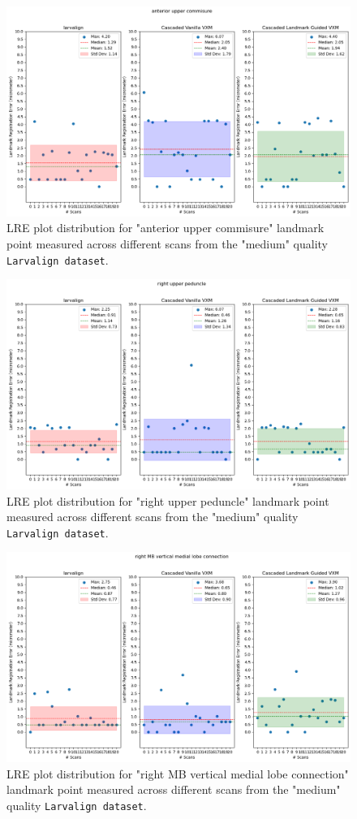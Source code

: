 	\begin{figure}[h!]
		\centering
		\includegraphics[width=0.75\columnwidth]{resources/chapter5_fresh/output/anterior upper commisure.png}
		\caption{LRE plot distribution for "anterior upper commisure" landmark point measured across different scans from the "medium" quality \texttt{Larvalign dataset}.}
		\label{fig:landmark18}
	\end{figure}

	\begin{figure}[h!]
		\centering
		\includegraphics[width=0.75\columnwidth]{resources/chapter5_fresh/output/right upper peduncle.png}
		\caption{LRE plot distribution for "right upper peduncle" landmark point measured across different scans from the "medium" quality \texttt{Larvalign dataset}.}
		\label{fig:landmark19}
	\end{figure}

	\begin{figure}[h!]
		\centering
		\includegraphics[width=0.75\columnwidth]{resources/chapter5_fresh/output/right MB vertical medial lobe connection.png}
		\caption{LRE plot distribution for "right MB vertical medial lobe connection" landmark point measured across different scans from the "medium" quality \texttt{Larvalign dataset}.}
		\label{fig:landmark20}
	\end{figure}

